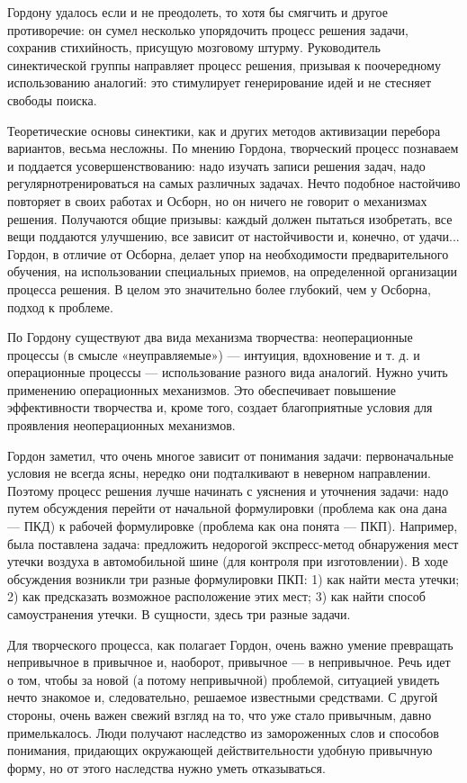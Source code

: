 Гордону  удалось  если  и  не   преодолеть,  то  хотя  бы  смягчить  и
другое противоречие:  он сумел  несколько упорядочить  процесс решения
задачи, сохранив стихийность,  присущую мозговому штурму. Руководитель
синектической   группы   направляет   процесс  решения,   призывая   к
поочередному  использованию  аналогий: это  стимулирует  генерирование
идей и не стесняет свободы поиска.

Теоретические  основы  синектики,  как и  других  методов  активизации
перебора  вариантов, весьма  несложны. По  мнению Гордона,  творческий
процесс познаваем и поддается  усовершенствованию: надо изучать записи
решения задач, надо регулярнотренироваться на самых различных задачах.
Нечто подобное  настойчиво повторяет в  своих работах и Осборн,  но он
ничего  не говорит  о  механизмах решения.  Получаются общие  призывы:
каждый должен  пытаться изобретать, все вещи  поддаются улучшению, все
зависит от настойчивости и, конечно,  от удачи... Гордон, в отличие от
Осборна,  делает  упор  на  необходимости  предварительного  обучения,
на  использовании  специальных  приемов, на  определенной  организации
процесса  решения.  В целом  это  значительно  более глубокий,  чем  у
Осборна, подход к проблеме.

По Гордону  существуют два  вида механизма  творчества: неоперационные
процессы (в смысле «неуправляемые») —  интуиция, вдохновение и т. д. и
операционные  процессы —  использование разного  вида аналогий.  Нужно
учить применению  операционных механизмов. Это  обеспечивает повышение
эффективности творчества и, кроме  того, создает благоприятные условия
для проявления неоперационных механизмов.

Гордон  заметил,  что  очень   многое  зависит  от  понимания  задачи:
первоначальные  условия  не  всегда  ясны,  нередко  они  подталкивают
в  неверном  направлении. Поэтому  процесс  решения  лучше начинать  с
уяснения  и  уточнения  задачи:   надо  путем  обсуждения  перейти  от
начальной  формулировки  (проблема  как  она дана  —  ПКД)  к  рабочей
формулировке  (проблема   как  она  понята  —   ПКП).  Например,  была
поставлена  задача:  предложить недорогой  экспресс-метод  обнаружения
мест   утечки  воздуха   в  автомобильной   шине  (для   контроля  при
изготовлении). В ходе обсуждения возникли три разные формулировки ПКП:
1) как найти  места утечки; 2) как  предсказать возможное расположение
этих  мест; 3)  как найти  способ самоустранения  утечки. В  сущности,
здесь три разные задачи.

Для  творческого процесса,  как  полагает Гордон,  очень важно  умение
превращать  непривычное  в  привычное   и,  наоборот,  привычное  —  в
непривычное. Речь  идет о том,  чтобы за новой (а  потому непривычной)
проблемой, ситуацией увидеть нечто знакомое и, следовательно, решаемое
известными средствами. С другой стороны,  очень важен свежий взгляд на
то,  что  уже  стало  привычным, давно  примелькалось.  Люди  получают
наследство  из  замороженных  слов  и  способов  понимания,  придающих
окружающей  действительности  удобную  привычную форму,  но  от  этого
наследства нужно уметь отказываться.

